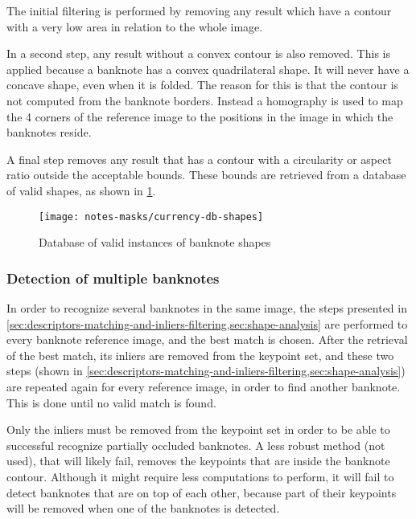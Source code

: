 The initial filtering is performed by removing any result which have a contour with a very low area in relation to the whole image.

In a second step, any result without a convex contour is also removed. This is applied because a banknote has a convex quadrilateral shape. It will never have a concave shape, even when it is folded. The reason for this is that the contour is not computed from the banknote borders. Instead a homography is used to map the 4 corners of the reference image to the positions in the image in which the banknotes reside.

A final step removes any result that has a contour with a circularity or aspect ratio outside the acceptable bounds. These bounds are retrieved from a database of valid shapes, as shown in \cref{fig:currency-db-shapes}.

\begin{figure}
	\centering
	\texttt{[image: notes-masks/currency-db-shapes]}
	\caption{Database of valid instances of banknote shapes}
	\label{fig:currency-db-shapes}
\end{figure}


\subsubsection{Detection of multiple banknotes}

In order to recognize several banknotes in the same image, the steps presented in \cref{sec:descriptors-matching-and-inliers-filtering,sec:shape-analysis} are performed to every banknote reference image, and the best match is chosen. After the retrieval of the best match, its inliers are removed from the keypoint set, and these two steps (shown in \cref{sec:descriptors-matching-and-inliers-filtering,sec:shape-analysis}) are repeated again for every reference image, in order to find another banknote. This is done until no valid match is found.

Only the inliers must be removed from the keypoint set in order to be able to successful recognize partially occluded banknotes. A less robust method (not used), that will likely fail, removes the keypoints that are inside the banknote contour. Although it might require less computations to perform, it will fail to detect banknotes that are on top of each other, because part of their keypoints will be removed when one of the banknotes is detected.
